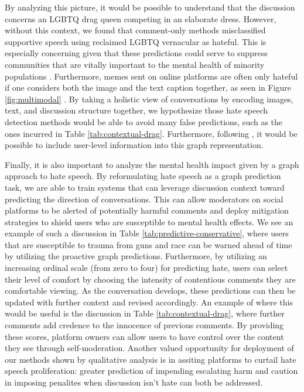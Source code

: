 \documentclass[letterpaper]{article} %
\newcommand{\edit}[1]{{#1}}
\begin{document}
By analyzing this picture, it would be possible to understand that the discussion concerns an LGBTQ drag queen competing in an elaborate dress. However, without this context, we found that comment-only methods misclassified supportive speech using reclaimed LGBTQ vernacular as hateful. This is especially concerning given that these predictions could serve to suppress communities that are vitally important to the mental health of minority populations \cite{lucero2017safe, fish2020stuck}. Furthermore, memes sent on online platforms are often only hateful if one considers both the image and the text caption together, as seen in Figure \ref{fig:multimodal} \cite{kiela2020hateful}. By taking a holistic view of conversations by encoding images, text, and discussion structure together, we hypothesize those hate speech detection methods would be able to avoid many false predictions, such as the ones incurred in Table \ref{tab:contextual-drag}. \edit{Furthermore, following \citet{tian-etal-2022-duck}, it would be possible to include user-level information into this graph representation.}

Finally, it is also important to analyze the mental health impact given by a graph approach to hate speech. By reformulating hate speech as a graph prediction task, we are able to train systems that can leverage discussion context toward predicting the direction of conversations. This can allow moderators on social platforms to be alerted of potentially harmful comments and deploy mitigation strategies to shield users who are susceptible to mental health effects. We see an example of such a discussion in Table \ref{tab:predictive-conservative}, where users that are susceptible to trauma from guns and race can be warned ahead of time by utilizing the proactive graph predictions. Furthermore, by utilizing an increasing ordinal scale (from zero to four) for predicting hate, users can select their level of comfort by choosing the intensity of contentious comments they are comfortable viewing. As the conversation develops, these predictions can then be updated with further context and revised accordingly. An example of where this would be useful is the discussion in Table \ref{tab:contextual-drag}, where further comments add credence to the innocence of previous comments. \edit{By providing these scores, platform owners can allow users to have control over the content they see through self-moderation. Another valued opportunity for deployment of our methods shown by qualitative analysis is in assiting platforms to curtail hate speech proliferation: greater prediction of impending escalating harm and caution in imposing penalites when discussion isn't hate can both be addressed. }
\end{document}
